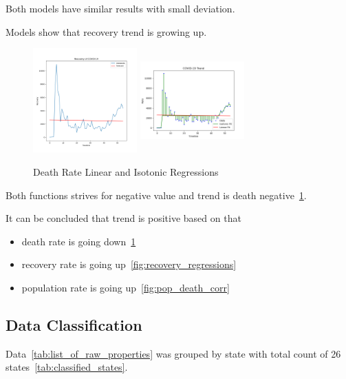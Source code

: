 Both models have similar results with small deviation.

Models show that recovery trend is growing up.


\begin{figure}[h]
    \includegraphics*[width=4cm, height=4cm]{../src/output/death_linear-regression.png}
    \includegraphics*[width=4cm, height=4cm]{../src/output/death_isotonic_regression.png}
    \caption{Death Rate Linear and Isotonic Regressions}
    \label{fig:death_regressions}
\end{figure}

Both functions strives for negative value and trend is death negative~\ref{fig:death_regressions}.

It can be concluded that trend is positive based on that

\begin{itemize}
    \item death rate is going down~\ref{fig:death_regressions}
    \item recovery rate is going up~\ref{fig:recovery_regressions}
    \item population rate is going up~\ref{fig:pop_death_corr}
\end{itemize}



\subsection{Data Classification}
\label{subsec:data-classification}

Data~\ref{tab:list_of_raw_properties} was grouped by state with total count of 26 states~\ref{tab:classified_states}.

